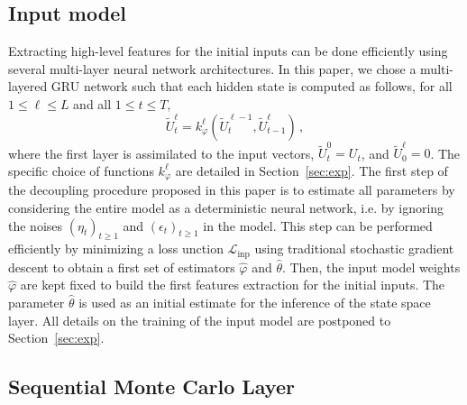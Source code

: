\documentclass{article}
\begin{document}
\subsection{Input model}%
\label{sub:input_model}
Extracting high-level features for the initial inputs can be done efficiently using several multi-layer neural network architectures.  In this paper, we chose a multi-layered GRU network such that each hidden state is computed as follows, for all $1 \leq \ell \leq L$ and all $1 \leq t \leq T$,
$$
	\tilde U^\ell_t = k_\varphi^\ell(\widetilde U^{\ell-1}_t, \widetilde U^\ell_{t-1})\,,
$$
where the first layer is assimilated to the input vectors, $\widetilde U_t^0 = U_t$, and  $\widetilde U^\ell_0 = 0$. The specific choice of functions $ k_\varphi^\ell$ are detailed in Section~\ref{sec:exp}.
The first step of the decoupling procedure proposed in this paper is to estimate all parameters by considering the entire model as a deterministic neural network, i.e. by ignoring the noises $(\eta_t)_{t\geq 1}$ and $(\epsilon_t)_{t\geq 1}$ in the model. This step can be performed efficiently by minimizing a loss unction $\mathcal{L}_{\mathrm{inp}}$ using traditional stochastic gradient descent to obtain a first set of estimators $\widehat \varphi$ and $ \widehat \theta$. Then, the input model weights $\widehat\varphi$ are kept fixed to build the first features extraction for the initial inputs. The parameter $ \widehat \theta$ is used as an initial estimate for the inference of  the state space  layer. All details on the training of the input model are postponed to Section~\ref{sec:exp}.

\subsection{Sequential Monte Carlo Layer}%
\label{sub:uncertainty_estimation}
\end{document}
